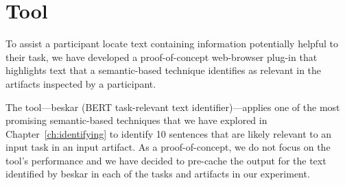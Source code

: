 \section{Tool}
\label{cp6:tool}


To assist a participant locate text containing information potentially helpful to their task, we have developed a proof-of-concept web-browser plug-in 
that highlights text that a semantic-based technique 
identifies as relevant in the artifacts inspected by a participant.



The tool---\acs{beskar} (BERT task-relevant text identifier)---applies 
one of the most promising semantic-based techniques that we have explored in Chapter~\ref{ch:identifying}
to identify 10 sentences that are likely relevant to an input task
in an input artifact. 
As a proof-of-concept, we do not focus on the tool's performance
and we have decided to pre-cache the output 
for the text identified by \acs{beskar} in each of the tasks and artifacts 
in our experiment. 






